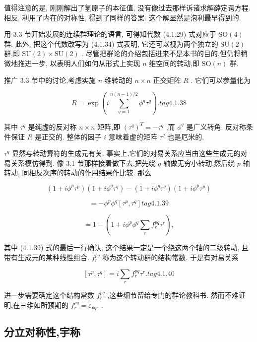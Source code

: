 值得注意的是, 刚刚解出了氢原子的本征值, 没有像过去那样诉诸求解薛定谔方程. 相反, 利用了内在的对称性, 得到了同样的答案. 这个解显然是泡利最早得到的.

用 3.3 节开始发展的连续群理论的语言, 可得知代数 (4.1.29) 式对应于 $\mathrm{{SO}}\left( 4\right)$ 群. 此外, 把这个代数改写为 (4.1.34) 式表明, 它还可以视为两个独立的 $\mathrm{{SU}}\left( 2\right)$ 群,即 $\mathrm{{SU}}\left( 2\right) \times \mathrm{{SU}}\left( 2\right)$ . 尽管把群论的介绍包括进来不是本书的目的,但仍将稍微地推进一步, 以表明人们如何从形式上实现 $n$ 维空间的转动,即 $\mathrm{{SO}}\left( n\right)$ 群.

推广 3.3 节中的讨论,考虑实施 $n$ 维转动的 $n \times n$ 正交矩阵 $R$ . 它们可以参量化为

$$
R = \exp \left( {i\mathop{\sum }\limits_{{q = 1}}^{{n\left( {n - 1}\right) /2}}{\phi }^{q}{\tau }^{q}}\right) . tag{4. 1.38}
$$

其中 ${\tau }^{q}$ 是纯虚的反对称 $n \times n$ 矩阵,即 ${\left( {\tau }^{q}\right) }^{T} = - {\tau }^{q}$ ,而 ${\phi }^{q}$ 是广义转角. 反对称条件保证 $R$ 是正交的. 整体的因子 $i$ 意味着虚的矩阵 ${\tau }^{q}$ 也是厄米的.

${\tau }^{q}$ 显然与转动算符的生成元有关. 事实上,它们的对易关系应当由这些生成元的对易关系模仿得到. 像 3.1 节那样接着做下去,把先绕 $q$ 轴做无穷小转动,然后绕 $p$ 轴转动, 同相反次序的转动的作用结果作比较. 那么

$$
\left( {1 + i{\phi }^{p}{\tau }^{p}}\right) \left( {1 + i{\phi }^{q}{\tau }^{q}}\right) - \left( {1 + i{\phi }^{q}{\tau }^{q}}\right) \left( {1 + i{\phi }^{p}{\tau }^{p}}\right)
$$

$$
= - {\phi }^{p}{\phi }^{q}\left\lbrack {{\tau }^{p},{\tau }^{q}}\right\rbrack tag{4. 1.39}
$$

$$
= 1 - \left( {1 + i{\phi }^{p}{\phi }^{q}\mathop{\sum }\limits_{r}{f}_{r}^{pq}{\tau }^{r}}\right) ,
$$

其中 (4.1.39) 式的最后一行确认, 这个结果一定是一个绕这两个轴的二级转动, 且带有生成元的某种线性组合. ${f}_{r}^{pq}$ 称为这个转动群的结构常数. 于是有对易关系

$$
\left\lbrack {{\tau }^{p},{\tau }^{q}}\right\rbrack = i\mathop{\sum }\limits_{r}{f}_{r}^{pq}{\tau }^{r}. tag{4. 1.40}
$$

进一步需要确定这个结构常数 ${f}_{r}^{pq}$ ,这些细节留给专门的群论教科书. 然而不难证明,在三维如所预期的 ${f}_{r}^{pq} = {\varepsilon }_{pqr}$ .

\subsection{分立对称性,宇称}

